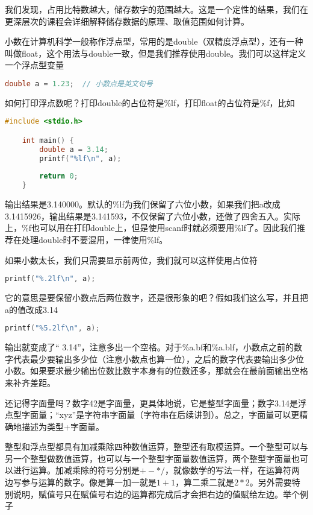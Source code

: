 我们发现，占用比特数越大，储存数字的范围越大。这是一个定性的结果，我们在更深层次的课程会详细解释储存数据的原理、取值范围如何计算。

小数在计算机科学一般称作浮点型，常用的是double（双精度浮点型），还有一种叫做float，这个用法与double一致，但是我们推荐使用double。我们可以这样定义一个浮点型变量

\begin{lstlisting}[language=C]
    double a = 1.23;  // 小数点是英文句号
\end{lstlisting}

如何打印浮点数呢？打印double的占位符是\%lf，打印float的占位符是\%f，比如

\begin{lstlisting}[language=C]
    #include <stdio.h>

    int main() {
        double a = 3.14;
        printf("%lf\n", a);
        
        return 0;
    }
\end{lstlisting}

输出结果是3.140000。默认的\%lf为我们保留了六位小数，如果我们把a改成3.1415926，输出结果是3.141593，不仅保留了六位小数，还做了四舍五入。实际上，\%f也可以用在打印double上，但是使用scanf时就必须要用\%lf了。因此我们推荐在处理double时不要混用，一律使用\%lf。

如果小数太长，我们只需要显示前两位，我们就可以这样使用占位符

\begin{lstlisting}[language=C]
    printf("%.2lf\n", a);
\end{lstlisting}

它的意思是要保留小数点后两位数字，还是很形象的吧？假如我们这么写，并且把a的值改成3.14

\begin{lstlisting}[language=C]
    printf("%5.2lf\n", a);
\end{lstlisting}

输出就变成了“ 3.14”，注意多出一个空格。对于\%a.bf和\%a.blf，小数点之前的数字代表最少要输出多少位（注意小数点也算一位），之后的数字代表要输出多少位小数。如果要求最少输出位数比数字本身有的位数还多，那就会在最前面输出空格来补齐差距。

还记得字面量吗？数字42是字面量，更具体地说，它是整型字面量；数字3.14是浮点型字面量；“xyz”是字符串字面量（字符串在后续讲到）。总之，字面量可以更精确地描述为类型+字面量。

整型和浮点型都具有加减乘除四种数值运算，整型还有取模运算。一个整型可以与另一个整型做数值运算，也可以与一个整型字面量数值运算，两个整型字面量也可以进行运算。加减乘除的符号分别是$+-*/$，就像数学的写法一样，在运算符两边写参与运算的数字。像是算一加一就是$1+1$，算二乘二就是$2*2$。另外需要特别说明，赋值号只在赋值号右边的运算都完成后才会把右边的值赋给左边。举个例子

